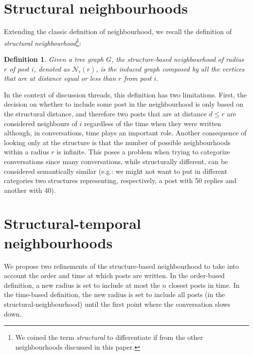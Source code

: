 \documentclass[conference]{IEEEtran}
\newtheorem{definition}{Definition}
\begin{document}

\section{Structural neighbourhoods}\label{sec:structural}
Extending the classic definition of neighbourhood, we recall the definition of \textit{structural neighbourhood}\footnote{We coined the term \textit{structural} to differentiate if from the other neighbourhoods discussed in this paper.}:

\begin{definition}
Given a tree graph $G$, the \textit{structure-based neighbourhood} of radius $r$ of post $i$, denoted as $\mathcal{N}_i(r)$, is the induced graph composed by all the vertices that are at distance equal or less than $r$ from post $i$.
\end{definition}
In the context of discussion threads, this definition has two limitations. First, the decision on whether to include some post in the neighbourhood is only based on the structural distance, and therefore two posts that are at distance $d\leq r$ are considered neighbours of $i$ regardless of the time when they were written although, in conversations, time plays an important role. Another consequence of looking only at the structure is that the number of possible neighbourhoods within a radius $r$ is infinite. This poses a problem when trying to categorize conversations since many conversations, while structurally different, can be considered semantically similar (e.g.: we might not want to put in different categories two structures representing, respectively, a post with 50 replies and another with 40).

\section{Structural-temporal neighbourhoods}\label{sec:temporal}
We propose two refinements of the structure-based neighbourhood to take into account the order and time at which posts are written. In the order-based definition, a new radius is set to include at most the $n$ closest posts in time.  In the time-based definition, the new radius is set to include all posts (in the structural-neighbourhood) until the first point where the conversation slows down. 
\end{document}
